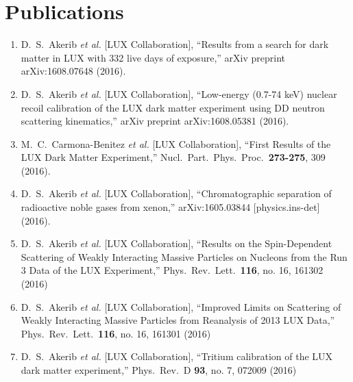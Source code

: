 \documentclass[a4paper,10pt]{article}
\begin{document}
\section{Publications}
\begin{enumerate}  

\item D.~S.~Akerib {\it et al.} [LUX Collaboration], ``Results from a search for dark matter in LUX with 332 live days of exposure,'' arXiv preprint arXiv:1608.07648 (2016).

\item D.~S.~Akerib {\it et al.} [LUX Collaboration],
  ``Low-energy (0.7-74 keV) nuclear recoil calibration of the LUX dark matter experiment using DD neutron scattering kinematics,'' arXiv preprint arXiv:1608.05381 (2016).

\item M.~C.~Carmona-Benitez {\it et al.} [LUX Collaboration],
  ``First Results of the LUX Dark Matter Experiment,''
  Nucl.\ Part.\ Phys.\ Proc.\  {\bf 273-275}, 309 (2016).
  
\item D.~S.~Akerib {\it et al.} [LUX Collaboration],
  ``Chromatographic separation of radioactive noble gases from xenon,''
  arXiv:1605.03844 [physics.ins-det] (2016).
  
\item   D.~S.~Akerib {\it et al.} [LUX Collaboration],
  ``Results on the Spin-Dependent Scattering of Weakly Interacting Massive Particles on Nucleons from the Run 3 Data of the LUX Experiment,''
  Phys.\ Rev.\ Lett.\  {\bf 116}, no. 16, 161302 (2016)
  
\item   D.~S.~Akerib {\it et al.} [LUX Collaboration],
  ``Improved Limits on Scattering of Weakly Interacting Massive Particles from Reanalysis of 2013 LUX Data,''
  Phys.\ Rev.\ Lett.\  {\bf 116}, no. 16, 161301 (2016)
  
\item   D.~S.~Akerib {\it et al.} [LUX Collaboration],
  ``Tritium calibration of the LUX dark matter experiment,''
  Phys.\ Rev.\ D {\bf 93}, no. 7, 072009 (2016)
  

\end{enumerate}
\end{document}
